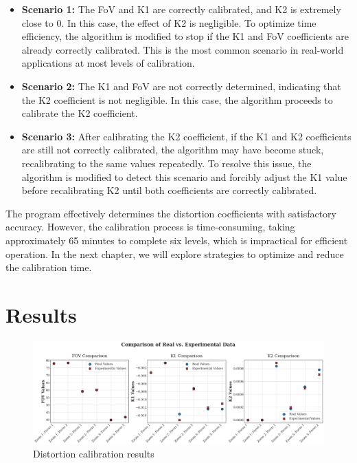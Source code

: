 \begin{itemize}
    \item \textbf{Scenario 1:} The \ac{FoV} and K1 are correctly calibrated, and K2 is extremely close to 0. In this case, the effect of K2 is negligible. To optimize time efficiency, the algorithm is modified to stop if the K1 and \ac{FoV} coefficients are already correctly calibrated. This is the most common scenario in real-world applications at most levels of calibration.
    
    \item \textbf{Scenario 2:} The K1 and \ac{FoV} are not correctly determined, indicating that the K2 coefficient is not negligible. In this case, the algorithm proceeds to calibrate the K2 coefficient.
    
    \item \textbf{Scenario 3:} After calibrating the K2 coefficient, if the K1 and K2 coefficients are still not correctly calibrated, the algorithm may have become stuck, recalibrating to the same values repeatedly. To resolve this issue, the algorithm is modified to detect this scenario and forcibly adjust the K1 value before recalibrating K2 until both coefficients are correctly calibrated.
\end{itemize}

\noindent The program effectively determines the distortion coefficients with satisfactory accuracy. However, the calibration process is time-consuming, taking approximately 65 minutes to complete six levels, which is impractical for efficient operation. In the next chapter, we will explore strategies to optimize and reduce the calibration time.

\section{Results} \label{sec:Results}

\begin{figure}[ht]
    \centering
    \includegraphics[width=1.1\textwidth]{Images/04calibration/novos_resul.png}
    \caption{Distortion calibration results}
    \label{fig:distortion}
\end{figure}




